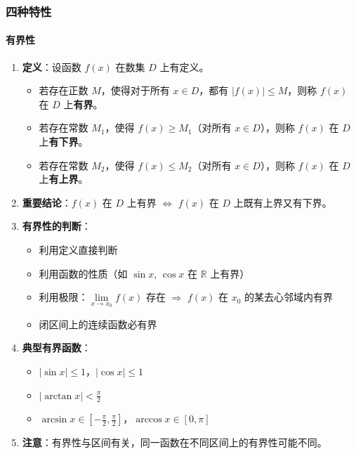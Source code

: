 \documentclass[../book.tex]{subfiles}
\begin{document}
    \subsubsection{四种特性}

    \paragraph{有界性}

    \begin{enumerate}
        \item \textbf{定义}：设函数 $f(x)$ 在数集 $D$ 上有定义。
        \begin{itemize}
            \item 若存在正数 $M$，使得对于所有 $x \in D$，都有 $|f(x)| \leq M$，则称 $f(x)$ 在 $D$ 上\textbf{有界}。
            \item 若存在常数 $M_1$，使得 $f(x) \geq M_1$（对所有 $x \in D$），则称 $f(x)$ 在 $D$ 上\textbf{有下界}。
            \item 若存在常数 $M_2$，使得 $f(x) \leq M_2$（对所有 $x \in D$），则称 $f(x)$ 在 $D$ 上\textbf{有上界}。
        \end{itemize}

        \item \textbf{重要结论}：$f(x)$ 在 $D$ 上有界 $\Leftrightarrow$ $f(x)$ 在 $D$ 上既有上界又有下界。

        \item \textbf{有界性的判断}：
        \begin{itemize}
            \item 利用定义直接判断
            \item 利用函数的性质（如 $\sin x$, $\cos x$ 在 $\mathbb{R}$ 上有界）
            \item 利用极限：$\lim\limits_{x \to x_0} f(x)$ 存在 $\Rightarrow$ $f(x)$ 在 $x_0$ 的某去心邻域内有界
            \item 闭区间上的连续函数必有界
        \end{itemize}

        \item \textbf{典型有界函数}：
        \begin{itemize}
            \item $|\sin x| \leq 1$，$|\cos x| \leq 1$
            \item $|\arctan x| < \frac{\pi}{2}$
            \item $\arcsin x \in [-\frac{\pi}{2}, \frac{\pi}{2}]$，$\arccos x \in [0, \pi]$
        \end{itemize}

        \item \textbf{注意}：有界性与区间有关，同一函数在不同区间上的有界性可能不同。
    \end{enumerate}
\end{document}
